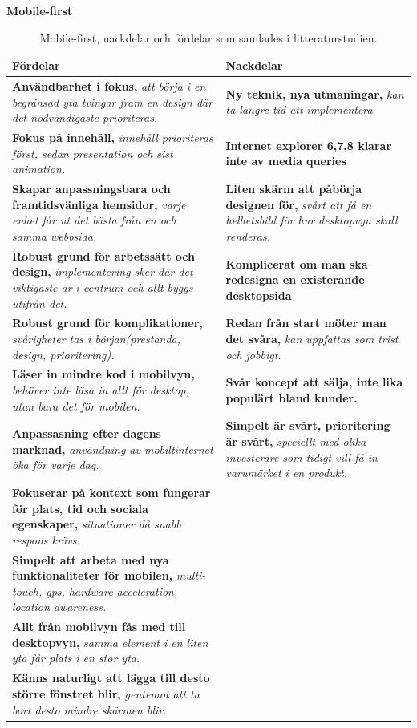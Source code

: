\documentclass[11pt]{article}
\begin{document}
\textbf{Mobile-first}
\begin{table}[H]
\centering
\begin{tabular}{|p{7.2cm}|p{7.2cm}|}
\hline
Fördelar&Nackdelar\\ \hline
\textbf{Användbarhet i fokus, }\textit{att börja i en begränsad yta tvingar fram en design där det nödvändigaste prioriteras.}&\textbf{Ny teknik, nya utmaningar,} \textit{kan ta längre tid att implementera}\\ \hline
\textbf{Fokus på innehåll, }\textit{innehåll prioriteras först, sedan presentation och sist animation.}&\textbf{Internet explorer 6,7,8 klarar inte av media queries} \\ \hline
\textbf{Skapar anpassningsbara och framtidsvänliga hemsidor, }\textit{varje enhet får ut det bästa från en och samma webbsida.}&\textbf{Liten skärm att påbörja designen för, } \textit{svårt att få en helhetsbild för hur desktopvyn skall renderas.}\\ \hline
\textbf{Robust grund för arbetssätt och design, }\textit{implementering sker där det viktigaste är i centrum och allt byggs utifrån det.}&\textbf{Komplicerat om man ska redesigna en existerande desktopsida}\\ \hline
\textbf{Robust grund för komplikationer, }\textit{svårigheter tas i början(prestanda, design, prioritering).}&\textbf{Redan från start möter man det svåra, } \textit{kan uppfattas som trist och jobbigt.}\\ \hline
\textbf{Läser in mindre kod i mobilvyn, }\textit{behöver inte läsa in allt för desktop, utan bara det för mobilen.}&\textbf{Svår koncept att sälja, inte lika populärt bland kunder.}\\ \hline
\textbf{Anpassasning efter dagens marknad, }\textit{användning av mobiltinternet öka för varje dag.}&\textbf{Simpelt är svårt, prioritering är svårt, } \textit{speciellt med olika investerare som tidigt vill få in varumärket i en produkt.}\\ \hline
\textbf{Fokuserar på kontext som fungerar för plats, tid och sociala egenskaper, }\textit{situationer då snabb respons krävs.}&~\\ \hline
\textbf{Simpelt att arbeta med nya funktionaliteter för mobilen, }\textit{multi-touch, gps, hardware acceleration, location awareness.}&~\\ \hline
\textbf{Allt från mobilvyn fås med till desktopvyn, }\textit{samma element i en liten yta får plats i en stor yta.}&~\\ \hline
\textbf{Känns naturligt att lägga till desto större fönstret blir, }\textit{gentemot att ta bort desto mindre skärmen blir.}&~\\ \hline

    \end{tabular}
    \caption {Mobile-first, nackdelar och fördelar som samlades i litteraturstudien.}
\end{table}
\newpage
\end{document}
